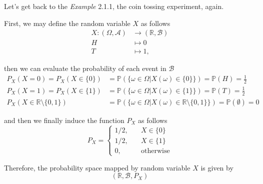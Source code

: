 \documentclass[twoside]{article}
\makeatletter
\theoremstyle{definition}
\theoremstyle{remark}
\theoremstyle{remark}
\newenvironment{example}
 {\patchcmd{\@thm}{\trivlist}{\list{}{\leftmargin=3em \rightmargin=3em}}{}{}%
  \vspace*{10\p@}
  \innerexample\pushQED{\hfill\ensuremath{\Diamond}}}
 {\popQED\endinnerexample}
\makeatother
\begin{document}
\begin{example}
  Let's get back to the \textit{Example} 2.1.1, the coin tossing experiment, again.

  First, we may define the random variable $X$ as follows
  \begin{equation*}
    \begin{split}
      X: (\Omega, \mathcal{A}) &\rightarrow (\mathbb{R}, \mathcal{B}) \\
      H &\mapsto 0 \\
      T &\mapsto 1,
    \end{split}
  \end{equation*}

  then we can evaluate the probability of each event in $\mathcal{B}$
  \begin{equation*}
    \begin{split}
      P_X(X = 0) = P_X(X \in \{0\})
      &= \mathbb{P}(\{\omega \in \Omega | X(\omega) \in \{0\}\})
      = \mathbb{P}(H) = \frac{1}{2}\\
      P_X(X = 1) = P_X(X \in \{1\})
      &= \mathbb{P}(\{\omega \in \Omega | X(\omega) \in \{1\}\})
      = \mathbb{P}(T) = \frac{1}{2} \\
      P_X(X \in \mathbb{R}\setminus\{0, 1\})
      &= \mathbb{P}(\{\omega \in \Omega | X(\omega) \in \mathbb{R}\setminus\{0, 1\}\})
      = \mathbb{P}(\emptyset) = 0
    \end{split}
  \end{equation*}

  and then we finally induce the function $P_X$ as follows
  \begin{equation*}
    P_X = \left\{
    \begin{array}{ll}
      1/2, & \quad X \in {\{0\}} \\
      1/2, & \quad X \in {\{1\}} \\
      0,   & \quad \textrm{otherwise}
    \end{array}
    \right.
  \end{equation*}

  Therefore, the probability space mapped by random variable $X$ is given by
  \begin{equation*}
    (\mathbb{R}, \mathcal{B}, P_X)
  \end{equation*}
\end{example}
\end{document}

